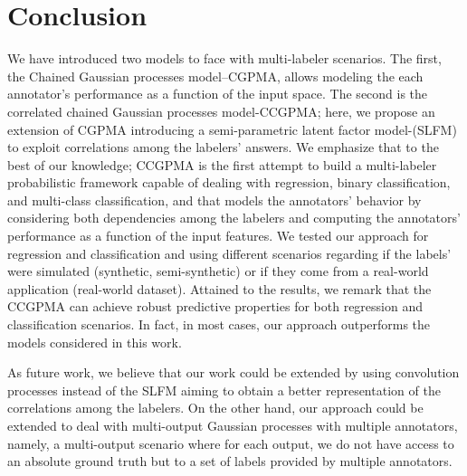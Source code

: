 \documentclass[journal]{IEEEtran}
\begin{document}
\section{Conclusion}
We have introduced two models to face with multi-labeler scenarios. The first, the Chained Gaussian processes model--CGPMA, allows modeling the each annotator's performance as a function of the input space. The second is the correlated chained Gaussian processes model-CCGPMA; here, we propose an extension of CGPMA introducing a semi-parametric latent factor model-(SLFM) to exploit correlations among the labelers' answers. We emphasize that to the best of our knowledge; CCGPMA is the first attempt to build a multi-labeler probabilistic framework capable of dealing with regression, binary classification, and multi-class classification, and that models the annotators' behavior by considering both dependencies among the labelers and computing the annotators' performance as a function of the input features. We tested our approach for regression and classification and using different scenarios regarding if the labels' were simulated (synthetic, semi-synthetic) or if they come from a real-world application (real-world dataset). Attained to the results, we remark that the CCGPMA can achieve robust predictive properties for both regression and classification scenarios. In fact, in most cases, our approach outperforms the models considered in this work. 

As future work, we believe that our work could be extended by using
convolution processes \cite{alvarez2011computationally} instead of the SLFM aiming to obtain a better representation of the correlations among the labelers. On the other hand, our approach could be extended to deal with multi-output Gaussian processes with multiple annotators, namely, a multi-output scenario where for each output, we do not have access to an absolute ground truth but to a set of labels provided by multiple annotators. 






\end{document}
